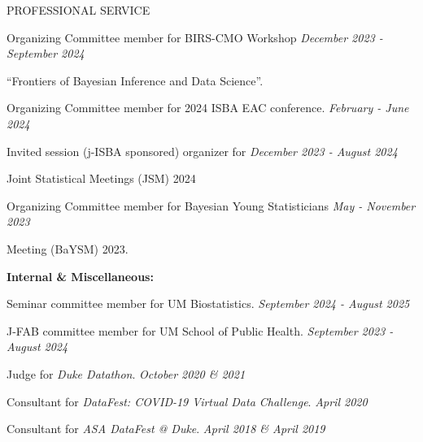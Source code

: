 \documentclass{resume} %
\newcommand{\thisYear}[1]{
	#1
}
\begin{document}
\begin{rSection}{PROFESSIONAL SERVICE}
 	\thisYear{
 Organizing Committee member for BIRS-CMO Workshop	\hfill {\em December 2023 - September 2024}
 
\vspace{-0.1in}

``Frontiers of Bayesian Inference and Data Science''. 
}

 
\smallskip 
 
		\thisYear{
Organizing Committee member for 2024 ISBA EAC conference. 	\hfill {\em February - June 2024}
}
	
\smallskip

	\thisYear{
Invited session (j-ISBA sponsored) organizer for  \hfill  {\em December 2023 - August 2024}

\vspace{-0.1in}

Joint Statistical Meetings (JSM) 2024
}

\smallskip
	
Organizing Committee member for Bayesian Young Statisticians  \hfill {\em May - November 2023}

\vspace{-0.1in}
Meeting (BaYSM) 2023.


 \hspace*{-0.2in}\textbf{Internal \& Miscellaneous: }
 
 Seminar committee member for UM Biostatistics. \hfill {\em September 2024 - August 2025}
 
 J-FAB committee member for UM School of Public Health.  \hfill {\em September 2023 - August 2024}

Judge for \emph{Duke Datathon}.  \hfill {\em October 2020 \& 2021}







\smallskip

Consultant for \emph{DataFest: COVID-19 Virtual Data Challenge}.  \hfill {\em April 2020}



\smallskip

Consultant for \emph{ASA DataFest @ Duke}. \hfill {\em April 2018 \& April 2019}
\end{rSection}
\end{document}

